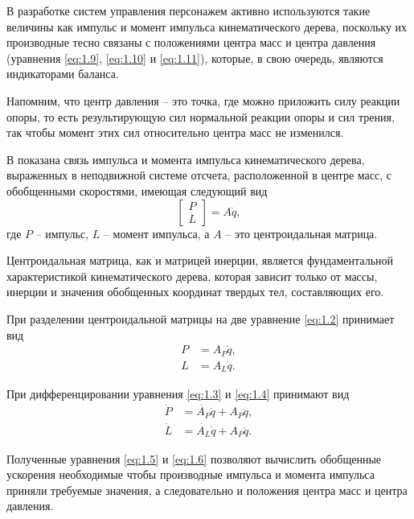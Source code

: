 В разработке систем управления персонажем активно используются такие величины как импульс и момент импульса кинематического дерева, поскольку их производные тесно связаны с положениями центра масс и центра давления (уравнения \ref{eq:1.9}, \ref{eq:1.10} и \ref{eq:1.11}), которые, в свою очередь, являются индикаторами баланса.

Напомним, что центр давления -- это точка, где можно приложить силу реакции опоры, то есть результирующую сил нормальной реакции опоры и сил трения, так чтобы момент этих сил относительно центра масс не изменился.

В \cite{OrinG} показана связь импульса и момента импульса кинематического дерева, выраженных в неподвижной системе отсчета, расположенной в центре масс, с обобщенными скоростями, имеющая следующий вид
\begin{equation*}
\begin{bmatrix} P\\ L \end{bmatrix} = A \dot{q}, \tag{1.2}\label{eq:1.2}
\end{equation*}
где $P$ -- импульс, $L$ -- момент импульса, а $A$ -- это центроидальная матрица.

Центроидальная матрица, как и матрицей инерции, является фундаментальной характеристикой кинематического дерева, которая зависит только от массы, инерции и значения обобщенных координат твердых тел, составляющих его.

При разделении центроидальной матрицы на две уравнение \ref{eq:1.2} принимает вид
\begin{align*}
  P &= A_{P} \dot{q}, \tag{1.3}\label{eq:1.3} \\
  L &= A_{L} \dot{q}. \tag{1.4}\label{eq:1.4}
\end{align*}

При дифференцировании уравнения \ref{eq:1.3} и \ref{eq:1.4} принимают вид
\begin{align*}
  \dot{P} &= \dot{A_{P}} \dot{q} + A_{P} \ddot{q}, \tag{1.5}\label{eq:1.5} \\
  \dot{L} &= \dot{A_{L}} \dot{q} + A_{P} \ddot{q}. \tag{1.6}\label{eq:1.6}
\end{align*}

Полученные уравнения \ref{eq:1.5} и \ref{eq:1.6} позволяют вычислить обобщенные ускорения необходимые чтобы производные импульса и момента импульса приняли требуемые значения, а следовательно и положения центра масс и центра давления.

